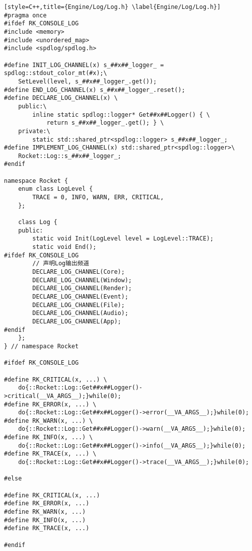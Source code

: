 \begin{lstlisting}[style=C++,title={Engine/Log/Log.h} \label{Engine/Log/Log.h}]
#pragma once
#ifdef RK_CONSOLE_LOG
#include <memory>
#include <unordered_map>
#include <spdlog/spdlog.h>

#define INIT_LOG_CHANNEL(x) s_##x##_logger_ = spdlog::stdout_color_mt(#x);\
    SetLevel(level, s_##x##_logger_.get());
#define END_LOG_CHANNEL(x) s_##x##_logger_.reset();
#define DECLARE_LOG_CHANNEL(x) \
    public:\
        inline static spdlog::logger* Get##x##Logger() { \
            return s_##x##_logger_.get(); } \
    private:\
        static std::shared_ptr<spdlog::logger> s_##x##_logger_;
#define IMPLEMENT_LOG_CHANNEL(x) std::shared_ptr<spdlog::logger>\
    Rocket::Log::s_##x##_logger_;
#endif

namespace Rocket {
    enum class LogLevel {
        TRACE = 0, INFO, WARN, ERR, CRITICAL,
    };

    class Log {
    public:
        static void Init(LogLevel level = LogLevel::TRACE);
        static void End();
#ifdef RK_CONSOLE_LOG
        // 声明Log输出频道
        DECLARE_LOG_CHANNEL(Core);
        DECLARE_LOG_CHANNEL(Window);
        DECLARE_LOG_CHANNEL(Render);
        DECLARE_LOG_CHANNEL(Event);
        DECLARE_LOG_CHANNEL(File);
        DECLARE_LOG_CHANNEL(Audio);
        DECLARE_LOG_CHANNEL(App);
#endif
    };
} // namespace Rocket

#ifdef RK_CONSOLE_LOG

#define RK_CRITICAL(x, ...) \
    do{::Rocket::Log::Get##x##Logger()->critical(__VA_ARGS__);}while(0);
#define RK_ERROR(x, ...) \
    do{::Rocket::Log::Get##x##Logger()->error(__VA_ARGS__);}while(0);
#define RK_WARN(x, ...) \
    do{::Rocket::Log::Get##x##Logger()->warn(__VA_ARGS__);}while(0);
#define RK_INFO(x, ...) \ 
    do{::Rocket::Log::Get##x##Logger()->info(__VA_ARGS__);}while(0);
#define RK_TRACE(x, ...) \ 
    do{::Rocket::Log::Get##x##Logger()->trace(__VA_ARGS__);}while(0);

#else

#define RK_CRITICAL(x, ...)
#define RK_ERROR(x, ...)
#define RK_WARN(x, ...)
#define RK_INFO(x, ...)
#define RK_TRACE(x, ...)

#endif
\end{lstlisting}

